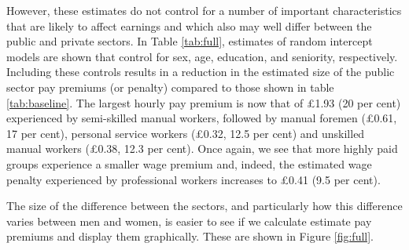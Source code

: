 \documentclass[a4paper,11pt,titlepage]{article}
\begin{document}
However, these estimates do not control for a number of important characteristics
that are likely to affect earnings and which also may well differ between the public and
private sectors. In Table \ref{tab:full}, estimates of random intercept models are shown that control
for sex, age, education, and seniority, respectively. Including these controls results in a reduction in the estimated size of the public sector pay premiums (or penalty) compared to those shown in table \ref{tab:baseline}.  The largest hourly pay premium is now that of \pounds 1.93 (20
per cent) experienced by semi-skilled manual workers, followed by manual foremen
(\pounds 0.61, 17 per cent), personal service workers (\pounds 0.32, 12.5 per cent) and unskilled manual
workers (\pounds 0.38, 12.3 per cent). Once again, we see that more highly paid groups experience a smaller wage premium and, indeed, the estimated wage penalty experienced by professional workers increases to \pounds 0.41 (9.5 per cent).

The size of the difference between the sectors, and particularly how this difference
varies between men and women, is easier to see if we calculate estimate pay premiums and display them graphically. These are shown in Figure \ref{fig:full}.
\end{document}
